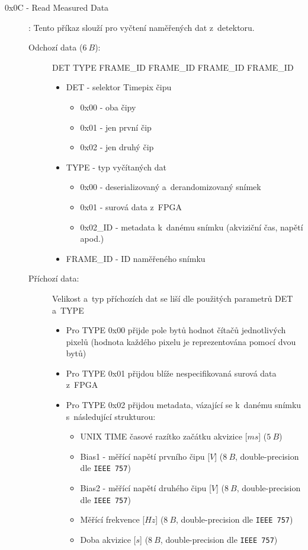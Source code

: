 \begin{description}
	\item[0x0C - Read Measured Data]:
		Tento příkaz slouží pro vyčtení naměřených dat z~detektoru.
		\begin{description}
			\item[Odchozí data ($6~B$):] DET TYPE FRAME\_ID FRAME\_ID FRAME\_ID FRAME\_ID
				\begin{itemize}
					\item DET - selektor Timepix čipu
						\begin{itemize}
							\item 0x00 - oba čipy
							\item 0x01 - jen první čip
							\item 0x02 - jen druhý čip
						\end{itemize}
					\item TYPE - typ vyčítaných dat
						\begin{itemize}
							\item 0x00 - deserializovaný a~derandomizovaný snímek
							\item 0x01 - surová data z~FPGA
							\item 0x02\_ID - metadata k~danému snímku (akviziční čas, napětí apod.)
						\end{itemize}
					\item FRAME\_ID - ID naměřeného snímku
				\end{itemize}
			\item[Příchozí data:] Velikost a~typ příchozích dat se liší dle použitých parametrů DET a~TYPE
				\begin{itemize}
					\item Pro TYPE 0x00 přijde pole bytů hodnot čítačů jednotlivých pixelů (hodnota každého pixelu je reprezentována pomocí dvou bytů)
					\item Pro TYPE 0x01 přijdou blíže nespecifikovaná surová data z~FPGA
					\item Pro TYPE 0x02 přijdou metadata, vázající se k~danému snímku s~následující strukturou:
						\begin{itemize}
							\item UNIX TIME časové razítko začátku akvizice [$ms$] ($5~B$)
							\item Bias1 - měřící napětí prvního čipu [$V$] ($8~B$, double-precision dle \texttt{IEEE 757})
							\item Bias2 - měřící napětí druhého čipu [$V$] ($8~B$, double-precision dle \texttt{IEEE 757})
							\item Měřící frekvence [$Hz$] ($8~B$, double-precision dle \texttt{IEEE 757})
							\item Doba akvizice [$s$] ($8~B$, double-precision dle \texttt{IEEE 757})
						\end{itemize}	


\end{itemize}
\end{description}
\end{description}
